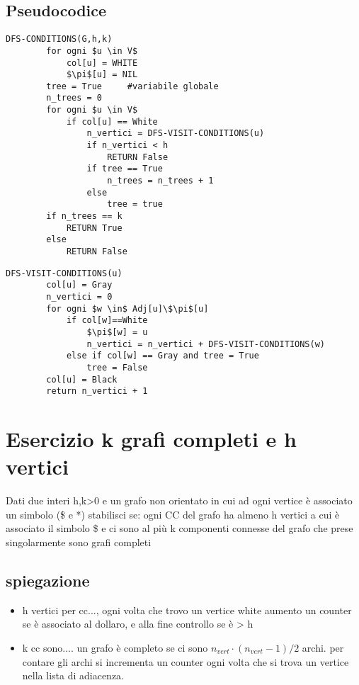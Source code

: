 \documentclass[12pt, a4paper, openany]{book}
\begin{document}
\subsection*{Pseudocodice}
\begin{lstlisting}[mathescape=true]
    DFS-CONDITIONS(G,h,k)
        for ogni $u \in V$
            col[u] = WHITE
            $\pi$[u] = NIL
        tree = True     #variabile globale
        n_trees = 0
        for ogni $u \in V$
            if col[u] == White
                n_vertici = DFS-VISIT-CONDITIONS(u)
                if n_vertici < h
                    RETURN False
                if tree == True
                    n_trees = n_trees + 1
                else
                    tree = true
        if n_trees == k
            RETURN True
        else
            RETURN False
\end{lstlisting}

\begin{lstlisting}[mathescape=true]
    DFS-VISIT-CONDITIONS(u)
        col[u] = Gray
        n_vertici = 0
        for ogni $w \in$ Adj[u]\$\pi$[u]
            if col[w]==White
                $\pi$[w] = u
                n_vertici = n_vertici + DFS-VISIT-CONDITIONS(w)
            else if col[w] == Gray and tree = True
                tree = False
        col[u] = Black
        return n_vertici + 1
\end{lstlisting}

\section{Esercizio k grafi completi e h vertici}
Dati due interi h,k>0 e un grafo non orientato  in cui ad ogni vertice è associato un simbolo (\$ e *)
stabilisci se: ogni CC del grafo ha almeno h vertici a cui è associato il simbolo \$
e ci sono al più k componenti connesse del grafo che prese singolarmente sono grafi completi

\subsection*{spiegazione}
\begin{itemize}
    \item h vertici per cc..., ogni volta che trovo un vertice white aumento un counter se è associato al dollaro, e alla fine controllo se è > h
    \item k cc sono.... un grafo è completo se ci sono $n_{vert} \cdot (n_{vert} -1)/2$ archi. per contare gli archi si incrementa un counter ogni volta che si trova un vertice nella lista di adiacenza.
\end{itemize}
\end{document}
